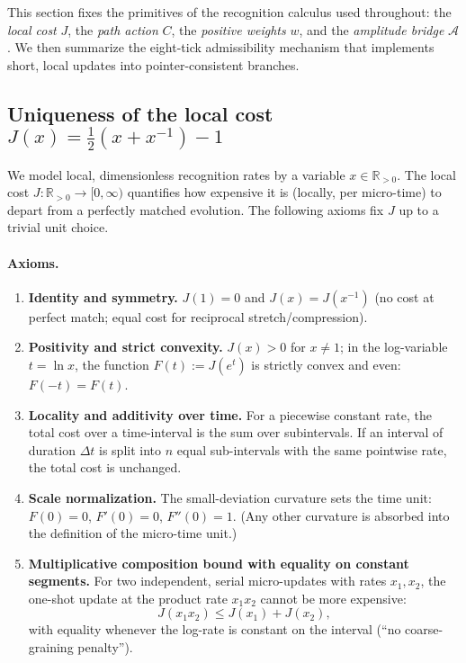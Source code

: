 \documentclass[11pt,letterpaper]{article}
\begin{document}
This section fixes the primitives of the recognition calculus used throughout: the \emph{local cost} \(J\), the \emph{path action} \(C\), the \emph{positive weights} \(w\), and the \emph{amplitude bridge} \(\mathcal A\). We then summarize the eight-tick admissibility mechanism that implements short, local updates into pointer-consistent branches.

\subsection{Uniqueness of the local cost \(J(x)=\frac12(x+x^{-1})-1\)}
We model local, dimensionless recognition rates by a variable \(x\in\mathbb R_{>0}\). The local cost \(J:\mathbb R_{>0}\!\to\![0,\infty)\) quantifies how expensive it is (locally, per micro-time) to depart from a perfectly matched evolution. The following axioms fix \(J\) up to a trivial unit choice.

\paragraph{Axioms.}
\begin{enumerate}
\item \textbf{Identity and symmetry.} \(J(1)=0\) and \(J(x)=J(x^{-1})\) (no cost at perfect match; equal cost for reciprocal stretch/compression).
\item \textbf{Positivity and strict convexity.} \(J(x)>0\) for \(x\neq 1\); in the log-variable \(t=\ln x\), the function \(F(t):=J(e^t)\) is strictly convex and even: \(F(-t)=F(t)\).
\item \textbf{Locality and additivity over time.} For a piecewise constant rate, the total cost over a time-interval is the sum over subintervals. If an interval of duration \(\Delta t\) is split into \(n\) equal sub-intervals with the same pointwise rate, the total cost is unchanged.
\item \textbf{Scale normalization.} The small-deviation curvature sets the time unit: \(F(0)=0\), \(F'(0)=0\), \(F''(0)=1\). (Any other curvature is absorbed into the definition of the micro-time unit.)
\item \textbf{Multiplicative composition bound with equality on constant segments.} For two independent, serial micro-updates with rates \(x_1,x_2\), the one-shot update at the product rate \(x_1x_2\) cannot be more expensive: 
\[
J(x_1x_2)\le J(x_1)+J(x_2),
\]
with equality whenever the log-rate is constant on the interval (``no coarse-graining penalty'').
\end{enumerate}
\end{document}
